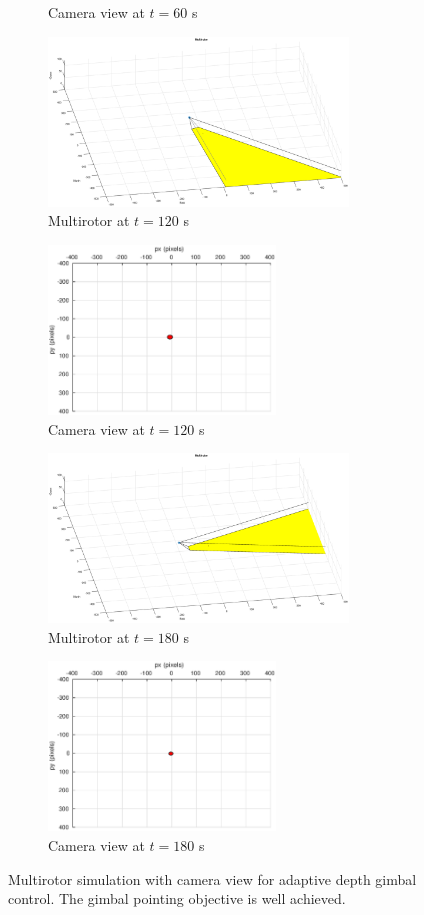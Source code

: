\begin{figure}[htbp]
\begin{subfigure}{0.5\textwidth}
		\caption{Camera view at $t=60$ s}
	\end{subfigure}	
	\begin{subfigure}{0.5\textwidth}
		\centering
		\includegraphics[height=4.5cm]{images/chapter2/uav_adaptive_120s}
		\caption{Multirotor at $t=120$ s}
	\end{subfigure}%
	\begin{subfigure}{0.5\textwidth}
		\centering
		\includegraphics[height=4.5cm]{images/chapter2/camera_adaptive_120s}
		\caption{Camera view at $t=120$ s}
	\end{subfigure}
	\begin{subfigure}{0.5\textwidth}
		\centering
		\includegraphics[height=4.5cm]{images/chapter2/uav_adaptive_180s}
		\caption{Multirotor at $t=180$ s}
	\end{subfigure}%
	\begin{subfigure}{0.5\textwidth}
		\centering
		\includegraphics[height=4.5cm]{images/chapter2/camera_adaptive_180s}
		\caption{Camera view at $t=180$ s}
	\end{subfigure}					
	\caption[Multirotor simulation with camera view for adaptive depth gimbal control.]{Multirotor simulation with camera view for adaptive depth gimbal control. The gimbal pointing objective is well achieved.}
	\label{uav_adaptive}
\end{figure}

